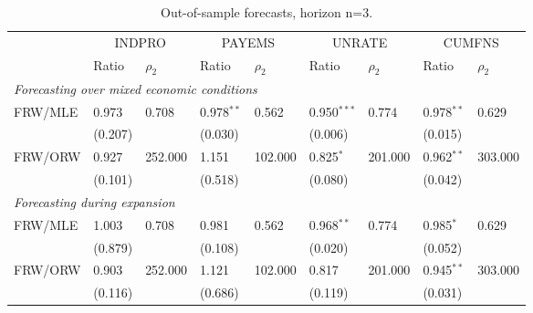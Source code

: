 \begin{table}
\centering
\small
\begin{tabular}{lllllllll}
\toprule
 & \multicolumn{2}{c}{INDPRO} & \multicolumn{2}{c}{PAYEMS} & \multicolumn{2}{c}{UNRATE} & \multicolumn{2}{c}{CUMFNS} \\
 & Ratio & $\rho_2$ & Ratio & $\rho_2$ & Ratio & $\rho_2$ & Ratio & $\rho_2$ \\
\midrule
\multicolumn{9}{l}{\textit{Forecasting over mixed economic conditions}}\\\midrule
FRW/MLE & 0.973 & 0.708 & 0.978$^{**}$ & 0.562 & 0.950$^{***}$ & 0.774 & 0.978$^{**}$ & 0.629 \\
 & (0.207) &  & (0.030) &  & (0.006) &  & (0.015) &  \\[1ex]
FRW/ORW & 0.927 & 252.000 & 1.151 & 102.000 & 0.825$^{*}$ & 201.000 & 0.962$^{**}$ & 303.000 \\
 & (0.101) &  & (0.518) &  & (0.080) &  & (0.042) &  \\[1ex]
\midrule
\multicolumn{9}{l}{\textit{Forecasting during expansion}}\\\midrule
FRW/MLE & 1.003 & 0.708 & 0.981 & 0.562 & 0.968$^{**}$ & 0.774 & 0.985$^{*}$ & 0.629 \\
 & (0.879) &  & (0.108) &  & (0.020) &  & (0.052) &  \\[1ex]
FRW/ORW & 0.903 & 252.000 & 1.121 & 102.000 & 0.817 & 201.000 & 0.945$^{**}$ & 303.000 \\
 & (0.116) &  & (0.686) &  & (0.119) &  & (0.031) &  \\[1ex]
\bottomrule
\end{tabular}
\caption{Out-of-sample forecasts, horizon n=3.}
\end{table}